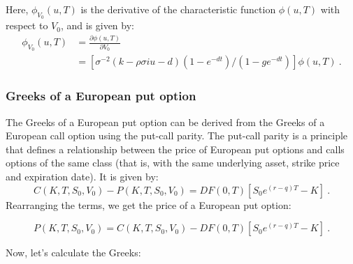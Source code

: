 \begin{itemize}
Here, $\phi_{V_0}(u,T)$ is the derivative of the characteristic function $\phi(u,T)$ with respect to $V_0$, and is given by:
$$
\begin{aligned}
\phi_{V_0}(u,T) &= \frac{ \partial  \phi(u,T)}{\partial V_0} \\ &= \left[ \sigma^{-2}(k-\rho\sigma iu - d)(1-e^{-dt})/(1-ge^{-dt}) \right] \phi(u,T) \ . 
\end{aligned}
$$

\end{itemize}






\subsubsection{Greeks of a European put option}

The Greeks of a European put option can be derived from the Greeks of a European call option using the put-call parity. The put-call parity is a principle that defines a relationship between the price of European put options and calls options of the same class (that is, with the same underlying asset, strike price and expiration date). It is given by:
$$
C(K, T, S_0, V_0) - P(K, T, S_0, V_0)  =DF(0,T)\left[ S_0 e^{(r-q) T} - K \right] \ .
$$
Rearranging the terms, we get the price of a European put option:

$$
P(K, T, S_0, V_0) = C(K, T, S_0, V_0) - DF(0,T)\left[ S_0 e^{(r-q) T} - K \right] \ .
$$

Now, let's calculate the Greeks:

